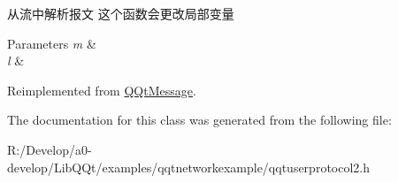 从流中解析报文 这个函数会更改局部变量 


\begin{DoxyParams}{Parameters}
{\em m} & \\
\hline
{\em l} & \\
\hline
\end{DoxyParams}


Reimplemented from \mbox{\hyperlink{class_q_qt_message_a0bc25669bdd61490b1d8df6d77565f31}{Q\+Qt\+Message}}.



The documentation for this class was generated from the following file\+:\begin{DoxyCompactItemize}
\item 
R\+:/\+Develop/a0-\/develop/\+Lib\+Q\+Qt/examples/qqtnetworkexample/qqtuserprotocol2.\+h\end{DoxyCompactItemize}
